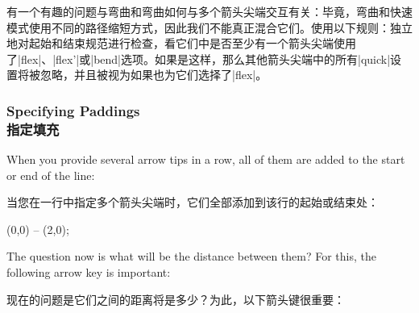 有一个有趣的问题与弯曲和弯曲如何与多个箭头尖端交互有关：毕竟，弯曲和快速模式使用不同的路径缩短方式，因此我们不能真正混合它们。使用以下规则：独立地对起始和结束规范进行检查，看它们中是否至少有一个箭头尖端使用了|flex|、|flex'|或|bend|选项。如果是这样，那么其他箭头尖端中的所有|quick|设置将被忽略，并且被视为如果也为它们选择了|flex|。


\subsubsection{Specifying Paddings\\指定填充}

When you provide several arrow tips in a row, all of them are added to the
start or end of the line:

当您在一行中指定多个箭头尖端时，它们全部添加到该行的起始或结束处：
\begin{codeexample}[]
\tikz \draw [<<<->>>>] (0,0) -- (2,0);
\end{codeexample}
%
The question now is what will be the distance between them? For this, the
following arrow key is important:

现在的问题是它们之间的距离将是多少？为此，以下箭头键很重要：

